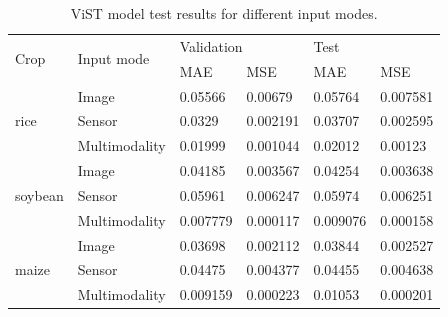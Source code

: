 \documentclass[acmsmall,manuscript, screen, review]{acmart}
\begin{document}
\begin{table}[htbp]
  \centering
  \caption{ViST model test results for different input modes.}
    \begin{tabular}{llllll}
    \hline
    \multicolumn{1}{l}{\multirow{2}[4]{*}{Crop}} & \multicolumn{1}{l|}{\multirow{2}[4]{*}{Input mode}} & \multicolumn{2}{p{8.38em}|}{{Validation}} & \multicolumn{2}{p{8.38em}}{{Test}} \\
\cline{3-6}          & \multicolumn{1}{l|}{} & \multicolumn{1}{p{4.19em}}{{MAE}} & \multicolumn{1}{p{4.19em}|}{{MSE}} & \multicolumn{1}{p{4.19em}}{{MAE}} & \multicolumn{1}{p{4.19em}}{{MSE}} \\
    \hline
    \multicolumn{1}{l}{\multirow{3}[1]{*}{rice}} & Image & 0.05566 & 0.00679 & 0.05764 & 0.007581 \\
          & Sensor & 0.0329 & 0.002191 & 0.03707 & 0.002595 \\
          & Multimodality & 0.01999 & 0.001044 & 0.02012 & 0.00123 \\
    \multicolumn{1}{l}{\multirow{3}[0]{*}{soybean}} & Image & 0.04185 & 0.003567 & 0.04254 & 0.003638 \\
          & Sensor & 0.05961 & 0.006247 & 0.05974 & 0.006251 \\
          & Multimodality & 0.007779 & 0.000117 & 0.009076 & 0.000158 \\
    \multicolumn{1}{l}{\multirow{3}[1]{*}{maize}} & Image & 0.03698 & 0.002112 & 0.03844 & 0.002527 \\
          & Sensor & 0.04475 & 0.004377 & 0.04455 & 0.004638 \\
          & Multimodality & 0.009159 & 0.000223 & 0.01053 & 0.000201 \\
    \hline
    \end{tabular}%
  \label{tab:vist_model_test_results}%
\end{table}%
\end{document}
